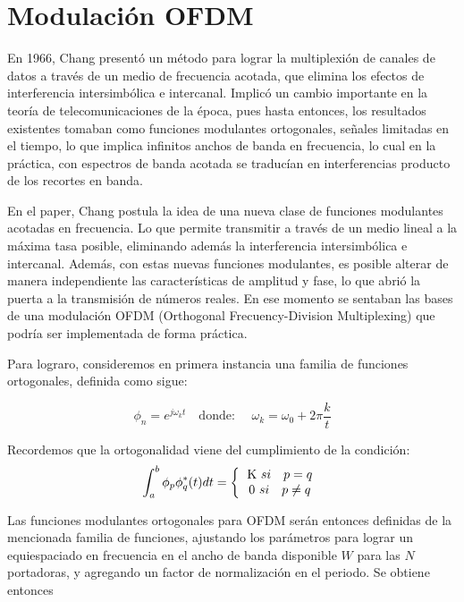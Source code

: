 \section{Modulación OFDM}

En 1966, Chang presentó un método para lograr la multiplexión de canales de datos a través de un medio de frecuencia acotada, que elimina los efectos de interferencia intersimbólica e intercanal\cite{chang-ofdm}. Implicó un cambio importante en la teoría de telecomunicaciones de la época, pues hasta entonces, los resultados existentes tomaban como funciones modulantes ortogonales, señales limitadas en el tiempo, lo que implica infinitos anchos de banda en frecuencia, lo cual en la práctica, con espectros de banda acotada se traducían en interferencias producto de los recortes en banda. 

En el paper, Chang postula la idea de una nueva clase de funciones modulantes acotadas en frecuencia. Lo que permite transmitir a través de un medio lineal a la máxima tasa posible, eliminando además la interferencia intersimbólica e intercanal. Además, con estas nuevas funciones modulantes, es posible alterar de manera independiente las características de amplitud y fase, lo que abrió la puerta a la transmisión de números reales. En ese momento se sentaban las bases de una modulación OFDM (Orthogonal Frecuency-Division Multiplexing) que podría ser implementada de forma práctica.

Para lograro, consideremos en primera instancia una familia de funciones ortogonales, definida como sigue:

\begin{equation*} 
  \phi_{n} = e^{j\omega_kt}  \quad\text{donde: }\quad \omega_k = \omega_0 + 2\pi\frac{k}{t}   
\end{equation*} 

Recordemos que la ortogonalidad viene del cumplimiento de la condición:
\begin{equation*}
	\int_{a}^{b} \phi_{p}\phi_{q}^{*}(t)dt = 
	\left \{
	\begin{tabular}{c}
	K $si \quad p = q$\\
	0 $si \quad p \neq q$
	\end{tabular}
	\right.
\end{equation*}

Las funciones modulantes ortogonales para OFDM serán entonces definidas de la mencionada familia de funciones, ajustando los parámetros para lograr un equiespaciado en frecuencia en el ancho de banda disponible $W$ para las $N$ portadoras, y agregando un factor de normalización en el periodo. Se obtiene entonces

